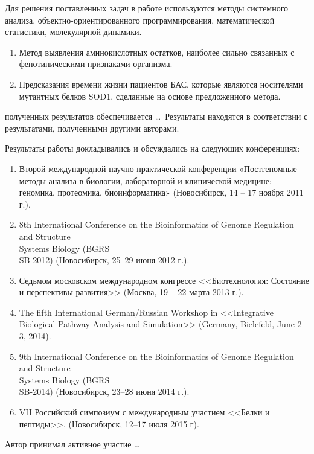 {\methods} Для решения поставленных задач в работе используются методы системного анализа, объектно-ориентированного программирования, математической статистики, молекулярной динамики.

{}
\begin{enumerate}
  \item Метод выявления аминокислотных остатков, наиболее сильно связанных с фенотипическими признаками организма.
  \item Предсказания времени жизни пациентов БАС, которые являются носителями мутантных белков SOD1, сделанные на основе предложенного метода.
\end{enumerate}

{\reliability} полученных результатов обеспечивается \ldots \ Результаты находятся в соответствии с результатами, полученными другими авторами.


{\probation}
Результаты работы докладывались и обсуждались на следующих конференциях:
\begin{enumerate}
\item Второй международной научно-практической конференции «Постгеномные методы анализа в биологии, лабораторной и клинической медицине: геномика, протеомика, биоинформатика» (Новосибирск, 14 – 17 ноября 2011 г.).
\item 8th International Conference on the Bioinformatics of Genome Regulation and Structure\\Systems Biology (BGRS\\SB-2012) (Новосибирск, 25–29 июня 2012 г.).
\item Седьмом московском международном конгрессе <<Биотехнология: Состояние и перспективы развития>> (Москва, 19 – 22 марта 2013 г.).
\item The fifth International German/Russian Workshop in <<Integrative Biological Pathway Analysis and Simulation>> (Germany, Bielefeld, June 2 – 3, 2014).
\item 9th International Conference on the Bioinformatics of Genome Regulation and Structure\\Systems Biology (BGRS\\SB-2014) (Новосибирск, 23–28 июня 2014 г.).
\item VII Российский симпозиум с международным участием <<Белки и пептиды>>, (Новосибирск, 12–17 июля 2015 г).
\end{enumerate}

{\contribution} Автор принимал активное участие \ldots


